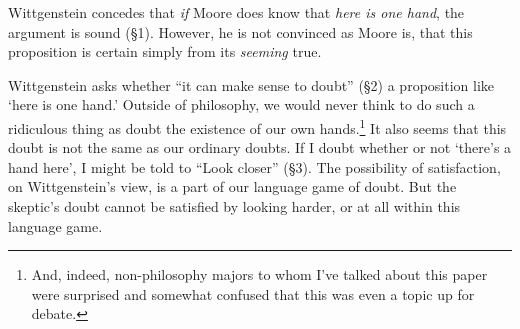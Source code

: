 \documentclass[man,12pt,natbib]{apa6}
\begin{document}
Wittgenstein concedes that \emph{if} Moore does know that \emph{here is one
hand}, the argument is sound (\S 1). However, he is not convinced as Moore is,
that this proposition is certain simply from its \emph{seeming} true.

Wittgenstein asks whether ``it can make sense to doubt'' (\S 2) a proposition
like `here is one hand.' Outside of philosophy, we would never think to do such
a ridiculous thing as doubt the existence of our own hands.\footnote{And,
	indeed, non-philosophy majors to whom I've talked about this paper were
surprised and somewhat confused that this was even a topic up for debate.}
It also seems that this doubt is not the same as our ordinary doubts.
If I doubt whether or not `there's a hand here', I might be told to ``Look
closer'' (\S 3). The possibility of satisfaction, on Wittgenstein's view, is a
part of our language game of doubt. But the skeptic's doubt cannot be satisfied
by looking harder, or at all within this language game.
%
\end{document}
